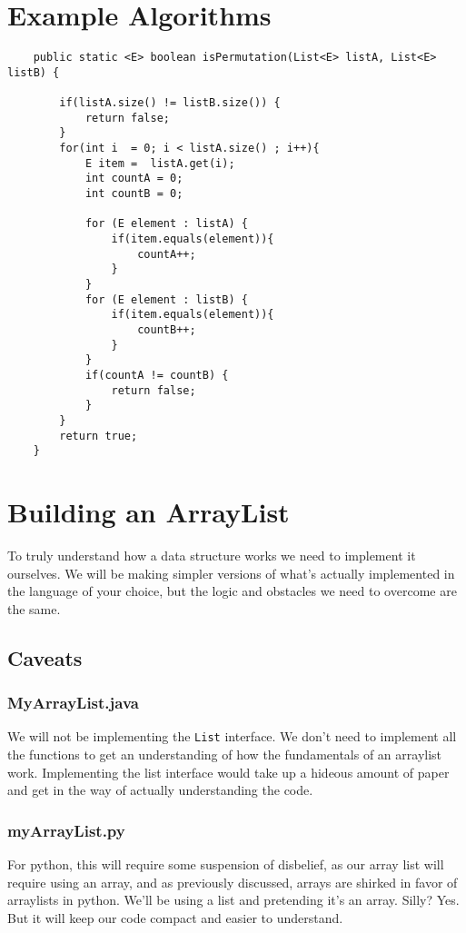 \section{Example Algorithms}


\begin{verbatim}
	public static <E> boolean isPermutation(List<E> listA, List<E> listB) {
		
		if(listA.size() != listB.size()) {
			return false;
		}
		for(int i  = 0; i < listA.size() ; i++){
			E item =  listA.get(i);
			int countA = 0;
			int countB = 0;
			
			for (E element : listA) {
				if(item.equals(element)){
					countA++;
				}
			}
			for (E element : listB) {
				if(item.equals(element)){
					countB++;
				}
			}
			if(countA != countB) {
				return false;
			}
		}
		return true;
	}
\end{verbatim}



\section{Building an ArrayList}
\label{buildingArraylist}
To truly understand how a data structure works we need to implement it ourselves.  We will be making simpler versions of what's actually implemented in the language of your choice, but the logic and obstacles we need to overcome are the same.  

\subsection{Caveats}

\subsubsection{MyArrayList.java}
We will not be implementing the \texttt{List} interface. We don't need to implement all the functions to get an understanding of how the fundamentals of an arraylist work.
Implementing the list interface would take up a hideous amount of paper and get in the way of actually understanding the code.

\subsubsection{myArrayList.py}

For python, this will require some suspension of disbelief, as our array list will require using an array, and as previously discussed, arrays are shirked in favor of arraylists in python.  We'll be using a list and pretending it's an array. Silly?  Yes.  But it will keep our code compact and easier to understand.

